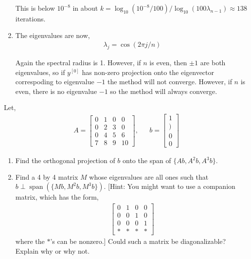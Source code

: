 \documentclass[10pt]{article}
\begin{document}
\begin{solution}[Solution]
\begin{enumerate}[label=(\alph*)]
        This is below \( 10^{-8} \) in about \( k = \log_{10} (10^{-8}/100) / \log_{10}( 100\lambda_{n-1}) \approx 138 \) iterations.
        
    \item 
        The eigenvalues are now,
        \begin{align*}
            \lambda_j = \cos(2\pi j /n)
        \end{align*}
        
        Again the spectral radius is 1. However, if \( n \) is even, then \( \pm 1 \) are both eigenvalues, so if \( y^{[0]} \) has non-zero projection onto the eigenvector correspoding to eigenvalue \( -1 \) the method will not converge. However, if \( n \) is even, there is no eigenvalue \( -1 \) so the method will always converge.

\end{enumerate}
\end{solution}


\begin{problem}
Let,
\begin{align*}
    A = \left[\begin{array}{cccc}0 & 1 & 0 & 0 \\ 0 & 2 & 3 & 0 \\ 0 & 4 & 5 & 6 \\ 7 & 8 & 9 & 10\end{array}\right]
    ,&&
    b = \left[\begin{array}{c}1 \\ ) \\ 0 \\ 0\end{array}\right]
\end{align*}
\begin{enumerate}[nolistsep,label=(\alph*)]
    \item Find the orthogonal projection of \( b \) onto the span of \( \{Ab,A^2b,A^3b\} \).
    \item Find a 4 by 4 matrix \( M \) whose eigenvalues are all ones such that \( b\perp\operatorname{span}(\{Mb,M^2b,M^3b\}) \).
        [Hint: You might want to use a companion matrix, which has the form,
        \begin{align*}
            \left[\begin{array}{cccc}0 & 1 & 0 & 0 \\ 0&0&1&0\\0&0&0&1\\ * & * & * & *\end{array}\right]
        \end{align*}
        where the \( * \)'s can be nonzero.] Could such a matrix be diagonalizable? Explain why or why not.
\end{enumerate}
\end{problem}
\end{document}
